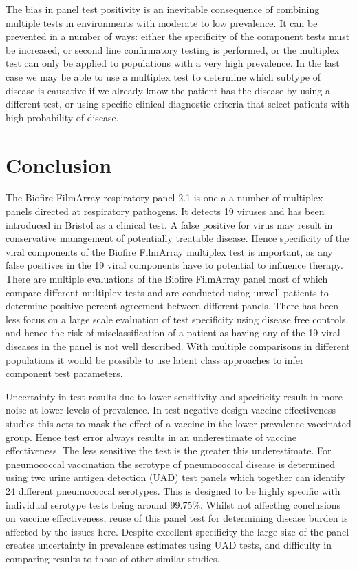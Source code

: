 \documentclass[10pt,letterpaper]{article}
\begin{document}
The bias in panel test positivity is an inevitable consequence of combining multiple tests in environments with moderate to low prevalence. It can be prevented in a number of ways: either the specificity of the component tests must be increased, or second line confirmatory testing is performed, or the multiplex test can only be applied to populations with a very high prevalence. In the last case we may be able to use a multiplex test to determine which subtype of disease is causative if we already know the patient has the disease by using a different test, or using specific clinical diagnostic criteria that select patients with high probability of disease.

\section*{Conclusion}

The Biofire FilmArray respiratory panel 2.1 is one a a number of multiplex panels directed at respiratory pathogens\cite{ramanan2017}. It detects 19 viruses\cite{chang2022,loeffelholz2020} and has been introduced in Bristol as a clinical test. A false positive for virus may result in conservative management of potentially treatable disease. Hence specificity of the viral components of the Biofire FilmArray multiplex test is important, as any false positives in the 19 viral components have to potential to influence therapy. There are multiple evaluations of the Biofire FilmArray panel\cite{popowitch2020,murphy2020,loeffelholz2020,leber2018,babady2013,chan2018} most of which compare different multiplex tests and are conducted using unwell patients to determine positive percent agreement between different panels. There has been less focus on a large scale evaluation of test specificity using disease free controls, and hence the risk of misclassification of a patient as having any of the 19 viral diseases in the panel is not well described. With multiple comparisons in different populations it would be possible to use latent class approaches to infer component test parameters\cite{johnson2001}.

Uncertainty in test results due to lower sensitivity and specificity result in more noise at lower levels of prevalence\cite{haile2022,endo2020}. In test negative design vaccine effectiveness studies this acts to mask the effect of a vaccine in the lower prevalence vaccinated group. Hence test error always results in an underestimate of vaccine effectiveness\cite{endo2020}. The less sensitive the test is the greater this underestimate. For pneumococcal vaccination the serotype of pneumococcal disease is determined using two urine antigen detection (UAD) test panels\cite{pride2012,bonten2015} which together can identify 24 different pneumococcal serotypes. This is designed to be highly specific with individual serotype tests being around 99.75\%. Whilst not affecting conclusions on vaccine effectiveness, reuse of this panel test for determining disease burden is affected by the issues here. Despite excellent specificity the large size of the panel creates uncertainty in prevalence estimates using UAD tests, and difficulty in comparing results to those of other similar studies.
\end{document}
